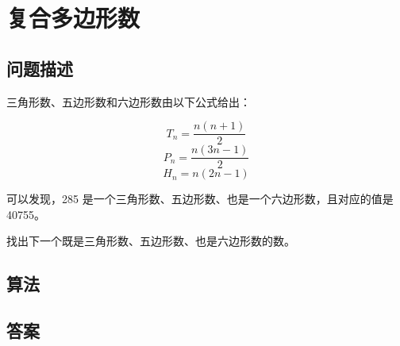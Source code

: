 \section{复合多边形数}
\subsection{问题描述}
\begin{tcolorbox}
	三角形数、五边形数和六边形数由以下公式给出：

	\[
		T_n = \frac{n(n + 1)}{2}
	\]
	\[
		P_n = \frac{n(3n - 1)}{2}
	\]
	\[
		H_n = n(2n - 1)
	\]

	可以发现，285 是一个三角形数、五边形数、也是一个六边形数，且对应的值是 40755。

	找出下一个既是三角形数、五边形数、也是六边形数的数。

\end{tcolorbox}

\subsection{算法}

\subsection{答案}
